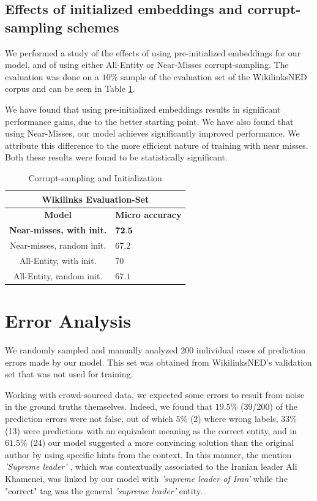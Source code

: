 \documentclass[11pt,letterpaper]{article}
\begin{document}
	\subsection{Effects of initialized embeddings and corrupt-sampling schemes}
	\label{experiments:effect}
	
	We performed a study of the effects of using pre-initialized embeddings for our model, and of using either All-Entity or Near-Misses corrupt-sampling. The evaluation was done on a $10\%$ sample of the evaluation set of the WikilinksNED corpus and can be seen in Table \ref{tab:c}. 
	
	We have found that using pre-initialized embeddings results in significant performance gains, due to the better starting point. We have also found that using Near-Misses, our model achieves significantly improved performance. We attribute this difference to the more efficient nature of training with near misses. Both these results were found to be statistically significant.
	
	
	\begin{table}[ht]
		\begin{center}
			\begin{tabular}{|c| p{1.5cm}|}
				\hline \multicolumn{2}{|c|}{Wikilinks Evaluation-Set} \\
				\hline \bf Model & \bf Micro     accuracy  \\ \hline
				\bf Near-misses, with init. &  $\bf 72.5$ \\ 
				Near-misses, random init. & $67.2$ \\ 
				All-Entity, with init. & $70$ \\ 
				All-Entity, random init. & $67.1$ \\ 
				\hline
			\end{tabular}
		\end{center}
		\caption{\label{tab:c} Corrupt-sampling and Initialization}
	\end{table}
	
	
	\section{Error Analysis}
	
	We randomly sampled and manually analyzed $200$ individual cases of prediction errors made by our model. This set was obtained from WikilinksNED's validation set that was not used for training. 
	
	Working with crowd-sourced data, we expected some errors to result from noise in the ground truths themselves. Indeed, we found that $19.5$\% (39/200) of the prediction errors were not false, out of which $5\%$ (2) where wrong labels, $33\%$ (13) were predictions with an equivalent meaning as the correct entity, and in $61.5\%$ (24) our model suggested a more convincing solution than the original author by using specific hints from the context. In this manner, the  mention \textit{'Supreme leader'} , which was contextually associated to the Iranian leader Ali Khamenei, was linked by our model with \textit{'supreme leader of Iran'} while the "correct" tag was the general \textit{'supreme leader'} entity.
	
\end{document}
